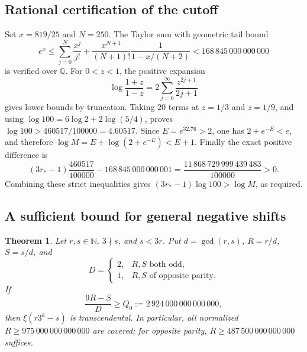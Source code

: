 \documentclass[11pt,a4paper]{article}
\newtheorem{theorem}{Theorem}[section]
\theoremstyle{definition}\newtheorem{definition}[theorem]{Definition}
\theoremstyle{remark}\newtheorem{remark}[theorem]{Remark}
\newcommand{\N}{\mathbb N}\newcommand{\Z}{\mathbb Z}\newcommand{\Q}{\mathbb Q}
\begin{document}
\subsection{Rational certification of the cutoff}\label{N01:app:rounding}

Set $x=819/25$ and $N=250$. The Taylor sum with geometric tail bound
\[
 e^x\le \sum_{j=0}^{N}\frac{x^j}{j!}
 +\frac{x^{N+1}}{(N+1)!}\frac{1}{1-x/(N+2)}
 <168\,845\,000\,000\,000
\]
is verified over $\Q$. For $0<z<1$, the positive expansion
\[
 \log\frac{1+z}{1-z}
 =2\sum_{j=0}^{\infty}\frac{z^{2j+1}}{2j+1}
\]
gives lower bounds by truncation. Taking $20$ terms at $z=1/3$ and
$z=1/9$, and using $\log100=6\log2+2\log(5/4)$, proves
$\log100>460517/100000=4.60517$.
Since $E=e^{32.76}>2$, one has $2+e^{-E}<e$, and therefore
$\log M=E+\log(2+e^{-E})<E+1$.
Finally the exact positive difference is
\[
 (3r_*-1)\frac{460517}{100000}
 -168\,845\,000\,000\,001
 =\frac{11\,868\,729\,999\,439\,483}{100000}>0.
\]
Combining these strict inequalities gives
$(3r_*-1)\log100>\log M$, as required.

\subsection{A sufficient bound for general negative shifts}\label{N01:app:general}

\begin{theorem}\label{N01:thm:general}
Let $r,s\in\N$, $3\nmid s$, and $s<3r$. Put
$d=\gcd(r,s)$, $R=r/d$, $S=s/d$, and
\[
 D=\begin{cases}2,&R,S\text{ both odd},\\1,&R,S\text{ of opposite parity}.
 \end{cases}
\]
If
\begin{equation}\label{N01:eq:general-cutoff}
 \frac{9R-S}{D}\ge Q_0:=2\,924\,000\,000\,000\,000,
\end{equation}
then $\xi(r3^k-s)$ is transcendental. In particular, all normalized
$R\ge975\,000\,000\,000\,000$ are covered; for opposite parity,
$R\ge487\,500\,000\,000\,000$ suffices.
\end{theorem}
\end{document}
